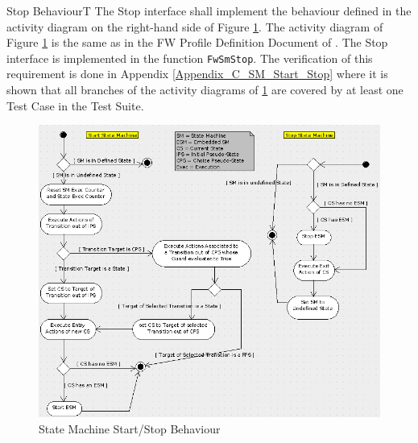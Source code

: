 \documentclass[a4paper,10pt]{article}
\newenvironment{fw_req}[6]
{\addtocounter{subsubsection}{1}
	\hspace{0.2cm}\textbf{FW-\arabic{section}.\arabic{subsection}.\arabic{subsubsection}/#2
	\hspace{0.8cm} #1}
	\vspace{-10pt}
\begin{longtable}{p{2.7cm}P{8.5cm}}
\hline
\textsc{Requirement} & #3 \\
\textsc{Justification} & #4 \\
\textsc{Implementation} & #5  \\ 
\textsc{Verification} & #6  \\
\hline
}
{\end{longtable}}
\begin{document}
\begin{fw_req}{Stop Behaviour}{T}
{The Stop interface shall implement the behaviour defined in 
the activity diagram on the right-hand side of Figure \ref{fig:SmStartStop}.}
{The activity diagram of Figure \ref{fig:SmStartStop} is the 
same as in the FW Profile Definition Document of \cite{ref:fwprofile}.}
{The Stop interface is implemented in the function \texttt{FwSmStop}.} 
{The verification of this requirement is done in Appendix \ref{Appendix_C_SM_Start_Stop} where it is shown that all branches of the activity diagrams of \ref{fig:SmStartStop} are covered by at least one Test Case in the Test Suite.}
\end{fw_req}


\begin{figure}[h]
 \centering
 \includegraphics[scale=0.415,keepaspectratio=true]{../images/SM_StartStop.png}
 \caption{State Machine Start/Stop Behaviour}
 \label{fig:SmStartStop}
\end{figure}
\end{document}
